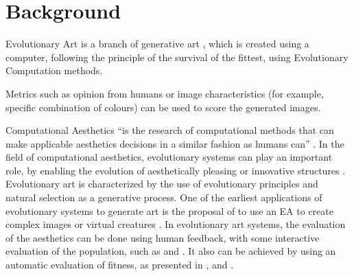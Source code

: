 \section{Background}

Evolutionary Art \cite{EART} is a branch of generative art \cite{PHEROGRAPHY}, which is created using a
computer, following the principle of the survival of the fittest, 
using Evolutionary Computation methods.

Metrics such as opinion from humans or image characteristics (for
example, specific combination of colours) can be used to score the
generated images. %

Computational Aesthetics ``is the research of computational
methods that can make applicable aesthetics decisions in a similar
fashion as humans can'' \cite{COMPAESTH}. In the field of
computational aesthetics, evolutionary systems can play an important
role, by enabling the evolution of aesthetically pleasing or
innovative structures \cite{dipaola2009incorporating}. Evolutionary %
art is characterized by the use of evolutionary principles and natural
selection as a generative process. One of the earliest applications of
evolutionary systems to generate art is the proposal of 
to use an EA to create complex images \cite{sims1991artificial} or
virtual creatures  \cite{sims1994evolving}. In evolutionary art
systems, the evaluation of the aesthetics can be done using human
feedback, with some interactive evaluation of the population, such as
\cite{ashlock2006evolutionary,draves2006electric,moroni2000vox} and
\cite{sims1991artificial}. It also can be achieved by using an
automatic evaluation of fitness, as presented in
\cite{aguilar2008robotic,den2010comparing,dipaola2009incorporating,li2012investigating},
and \cite{sims1994evolving}. %

